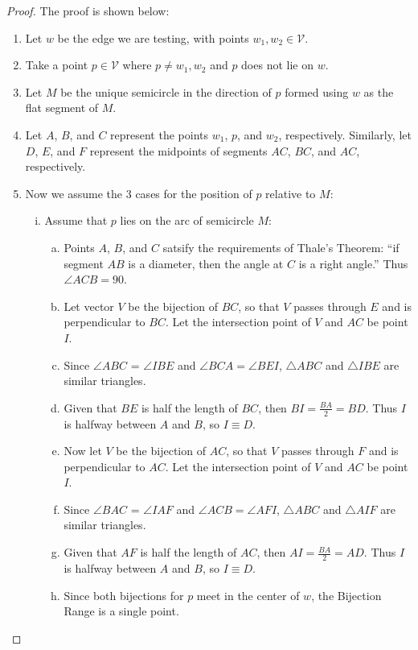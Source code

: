 \documentclass[12pt]{article}
\begin{document}
\begin{proof} The proof is shown below:
\begin{enumerate}[(1)]
\item Let $w$ be the edge we are testing, with points $w_1,w_2 \in \mathcal{V}$.
\item Take a point $p \in \mathcal{V}$ where $p \neq w_1,w_2$ and $p$ does not lie on $w$.
\item Let $M$ be the unique semicircle in the direction of $p$ formed using $w$ as the
flat segment of $M$.
\item Let $A$, $B$, and $C$ represent the points $w_1$, $p$, and $w_2$, respectively.
Similarly, let $D$, $E$, and $F$ represent the midpoints of segments
$AC$, $BC$, and $AC$, respectively.
\item Now we assume the 3 cases for the position of $p$ relative to $M$:
\begin{enumerate}[(i)]
\item Assume that $p$ lies on the arc of semicircle $M$:
\begin{enumerate}[(a)]
\item Points $A$, $B$, and $C$ satsify the requirements of Thale's Theorem:
``if segment $AB$ is a diameter, then the angle at $C$ is a right angle.''
Thus $\angle ACB = 90$.
\item Let vector $V$ be the bijection of $BC$, so that $V$ passes through
$E$ and is perpendicular to $BC$.
Let the intersection point of $V$ and $AC$ be point $I$.
\item Since $\angle ABC$ = $\angle IBE$ and $\angle BCA = \angle BEI$,
$\triangle ABC$ and $\triangle IBE$ are similar triangles.
\item Given that $BE$ is half the length of $BC$,
then $BI = \frac{BA}{2} = BD$.
Thus $I$ is halfway between $A$ and $B$, so $I \equiv D$.
\item Now let $V$ be the bijection of $AC$, so that $V$ passes through
$F$ and is perpendicular to $AC$.
Let the intersection point of $V$ and $AC$ be point $I$.
\item Since $\angle BAC$ = $\angle IAF$ and $\angle ACB = \angle AFI$,
$\triangle ABC$ and $\triangle AIF$ are similar triangles.
\item Given that $AF$ is half the length of $AC$,
then $AI = \frac{BA}{2} = AD$.
Thus $I$ is halfway between $A$ and $B$, so $I \equiv D$.
\item Since both bijections for $p$ meet in the center of $w$,
the Bijection Range is a single point.
\end{enumerate}

\end{enumerate}
\end{enumerate}
\end{proof}
\end{document}
